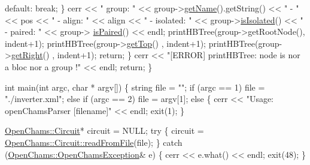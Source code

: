 \begin{DoxyCodeInclude}
            \textcolor{keywordflow}{default}:
                \textcolor{keywordflow}{break};
        \}
        cerr << \textcolor{stringliteral}{" group: "} << group->\hyperlink{class_open_chams_1_1_node_aef436e6e20d1dbf2eb78b089ca9d0794}{getName}().getString() << \textcolor{stringliteral}{" - "} << pos << \textcolor{stringliteral}{" - align: "} << align 
      << \textcolor{stringliteral}{" - isolated: "} << group->\hyperlink{class_open_chams_1_1_group_ab5ae4a4550c418c974ff6e59967eeec2}{isIsolated}() << \textcolor{stringliteral}{" - paired: "} << group->
      \hyperlink{class_open_chams_1_1_group_aee0abf07a6e9d41f511c648e6eaecea3}{isPaired}() << endl; 
        printHBTree(group->getRootNode(), indent+1);
        printHBTree(group->\hyperlink{class_open_chams_1_1_node_af59967a8c2d5a04ca0a58e2ef29bead1}{getTop}()     , indent+1);
        printHBTree(group->\hyperlink{class_open_chams_1_1_node_a9533ddcf078ddfc2a4e9bd9ffafa51cb}{getRight}()   , indent+1);
        \textcolor{keywordflow}{return};
    \}
    cerr << \textcolor{stringliteral}{"[ERROR] printHBTree: node is nor a bloc nor a group !"} << endl;
    \textcolor{keywordflow}{return};
\}

\textcolor{keywordtype}{int} main(\textcolor{keywordtype}{int} argc, \textcolor{keywordtype}{char} * argv[]) \{
    \textcolor{keywordtype}{string} file = \textcolor{stringliteral}{""};
    \textcolor{keywordflow}{if} (argc == 1)
        file = \textcolor{stringliteral}{"./inverter.xml"};
    \textcolor{keywordflow}{else} \textcolor{keywordflow}{if} (argc == 2)
        file = argv[1];
    \textcolor{keywordflow}{else} \{
        cerr << \textcolor{stringliteral}{"Usage: openChamsParser [filename]"} << endl;
        exit(1);
    \}

    \hyperlink{class_open_chams_1_1_circuit}{OpenChams::Circuit}* circuit = NULL;
    \textcolor{keywordflow}{try} \{
        circuit = \hyperlink{class_open_chams_1_1_circuit_ad0aa3183bdea59e62f69c295026b7fe7}{OpenChams::Circuit::readFromFile}(file);
    \} \textcolor{keywordflow}{catch} (\hyperlink{class_open_chams_1_1_open_chams_exception}{OpenChams::OpenChamsException}& e) \{
        cerr << e.what() << endl;
        exit(48);
    \}


\end{DoxyCodeInclude}
